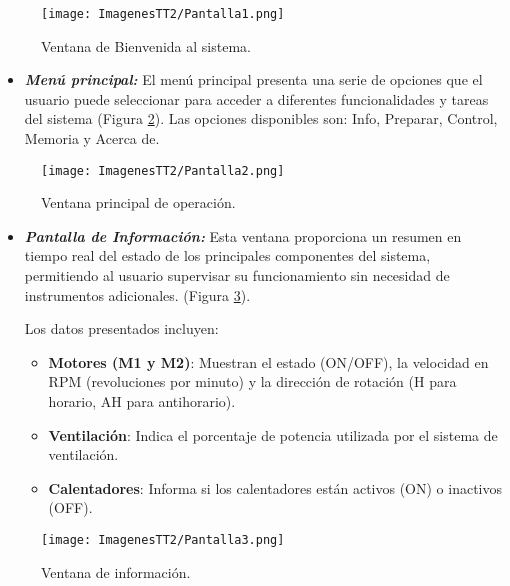 \documentclass[14pt,oneside]{extarticle} %
\begin{document}
\begin{figure}[h!]
    \centering
    \texttt{[image: ImagenesTT2/Pantalla1.png]}
    \caption{Ventana de Bienvenida al sistema.}
    \label{fig:Pantalla1}
\end{figure}

\begin{itemize}
    \item \textit{\textbf{Menú principal:}} El menú principal presenta una serie de opciones que el usuario puede seleccionar para acceder a diferentes funcionalidades y tareas del sistema (Figura \ref{fig:Pantalla2}). Las opciones disponibles son: Info, Preparar, Control, Memoria y Acerca de.
\end{itemize}

\begin{figure}[h!]
    \centering
    \texttt{[image: ImagenesTT2/Pantalla2.png]}
    \caption{Ventana principal de operación.}
    \label{fig:Pantalla2}
\end{figure}

\begin{itemize}
    \item \textit{\textbf{Pantalla de Información:}} Esta ventana proporciona un resumen en tiempo real del estado de los principales componentes del sistema, permitiendo al usuario supervisar su funcionamiento sin necesidad de instrumentos adicionales. (Figura \ref{fig:Pantalla3}). 

    Los datos presentados incluyen:
    \begin{itemize}
        \item \textbf{Motores (M1 y M2)}: Muestran el estado (ON/OFF), la velocidad en RPM (revoluciones por minuto) y la dirección de rotación (H para horario, AH para antihorario).
        \item \textbf{Ventilación}: Indica el porcentaje de potencia utilizada por el sistema de ventilación.
        \item \textbf{Calentadores}: Informa si los calentadores están activos (ON) o inactivos (OFF).
    \end{itemize}
    
\end{itemize}

\begin{figure}[h!]
    \centering
    \texttt{[image: ImagenesTT2/Pantalla3.png]}
    \caption{Ventana de información.}
    \label{fig:Pantalla3}
\end{figure}
\end{document}
